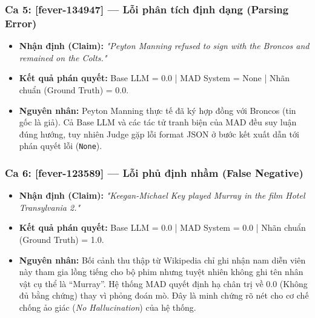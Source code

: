\documentclass[12pt,a4paper]{report}
\begin{document}
\subsubsection{Ca 5: [fever-134947] — Lỗi phân tích định dạng (Parsing Error)}
\begin{itemize}
    \item \textbf{Nhận định (Claim):} \textit{"Peyton Manning refused to sign with the Broncos and remained on the Colts."}
    \item \textbf{Kết quả phán quyết:} Base LLM = 0.0 | MAD System = None | Nhãn chuẩn (Ground Truth) = 0.0.
    \item \textbf{Nguyên nhân:} Peyton Manning thực tế đã ký hợp đồng với Broncos (tin gốc là giả). Cả Base LLM và các tác tử tranh biện của MAD đều suy luận đúng hướng, tuy nhiên Judge gặp lỗi format JSON ở bước kết xuất dẫn tới phán quyết lỗi (\texttt{None}).
\end{itemize}

\subsubsection{Ca 6: [fever-123589] — Lỗi phủ định nhầm (False Negative)}
\begin{itemize}
    \item \textbf{Nhận định (Claim):} \textit{"Keegan-Michael Key played Murray in the film Hotel Transylvania 2."}
    \item \textbf{Kết quả phán quyết:} Base LLM = 0.0 | MAD System = 0.0 | Nhãn chuẩn (Ground Truth) = 1.0.
    \item \textbf{Nguyên nhân:} Bối cảnh thu thập từ Wikipedia chỉ ghi nhận nam diễn viên này tham gia lồng tiếng cho bộ phim nhưng tuyệt nhiên không ghi tên nhân vật cụ thể là ``Murray''. Hệ thống MAD quyết định hạ chân trị về $0.0$ (Không đủ bằng chứng) thay vì phỏng đoán mò. Đây là minh chứng rõ nét cho cơ chế chống ảo giác (\textit{No Hallucination}) của hệ thống.
\end{itemize}
\end{document}
